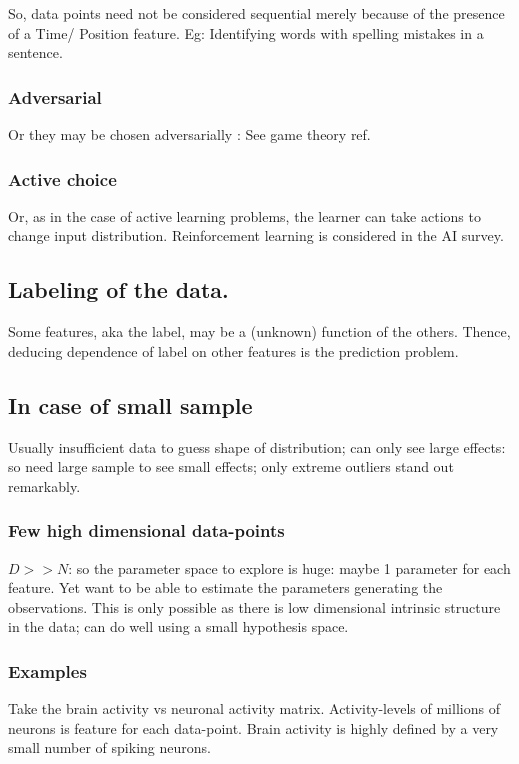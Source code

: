 \documentclass[oneside, article]{memoir}
\begin{document}
So, data points need not be considered sequential merely because of the presence of a Time/ Position feature. Eg: Identifying words with spelling mistakes in a sentence.

\subsubsection{Adversarial}
Or they may be chosen adversarially : See game theory ref.

\subsubsection{Active choice}
Or, as in the case of active learning problems, the learner can take actions to change input distribution. Reinforcement learning is considered in the AI survey.

\subsection{Labeling of the data.}
Some features, aka the label, may be a (unknown) function of the others. Thence, deducing dependence of label on other features is the prediction problem.

\subsection{In case of small sample}
Usually insufficient data to guess shape of distribution; can only see large effects: so need large sample to see small effects; only extreme outliers stand out remarkably.

\subsubsection{Few high dimensional data-points}
$D >> N$: so the parameter space to explore is huge: maybe 1 parameter for each feature. Yet want to be able to estimate the parameters generating the observations. This is only possible as there is low dimensional intrinsic structure in the data; can do well using a small hypothesis space.

\subsubsection{Examples}
Take the brain activity vs neuronal activity matrix. Activity-levels of millions of neurons is feature for each data-point. Brain activity is highly defined by a very small number of spiking neurons.
\end{document}
